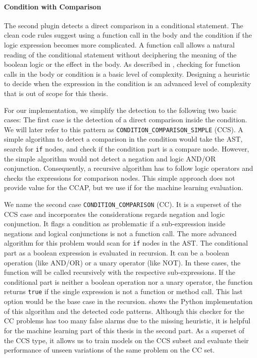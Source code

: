 \paragraph{Condition with Comparison}\label{sec:condition_comparison}
The second plugin detects a direct comparison in a conditional statement. 
The clean code rules suggest using a function call in the body and the condition if the logic expression becomes more complicated. A function call allows a natural reading of the conditional statement without deciphering the meaning of the boolean logic or the effect in the body. As described in , checking for function calls in the body or condition is a basic level of complexity. Designing a heuristic to decide when the expression in the condition is an advanced level of complexity that is out of scope for this thesis.

For our implementation, we simplify the detection to the following two basic cases: 
The first case is the detection of a direct comparison inside the condition. We will later refer to this pattern as \texttt{CONDITION\_COMPARISON\_SIMPLE} (CCS).
A simple algorithm to detect a comparison in the condition would take the AST, search for \texttt{if} nodes, and check if the condition part is a compare node.
However, the simple algorithm would not detect a negation and logic AND/OR conjunction. Consequently, a recursive algorithm has to follow logic operators and checks the expressions for comparison nodes. This simple approach does not provide value for the CCAP, but we use if for the machine learning evaluation. 

We name the second case \texttt{CONDITION\_COMPARISON} (CC). It is a superset of the CCS case and incorporates the considerations regards negation and logic conjunction. It flags a condition as problematic if a sub-expression inside negations and logical conjunctions is not a function call.
The more advanced algorithm for this problem would scan for \texttt{if} nodes in the AST. The conditional part as a boolean expression is evaluated in recursion. It can be a boolean operation (like AND/OR) or a unary operator (like NOT). In these cases, the function will be called recursively with the respective sub-expressions. If the conditional part is neither a boolean operation nor a unary operator, the function returns \texttt{true} if the single expression is not a function or method call. This last option would be the base case in the recursion.  shows the Python implementation of this algorithm and the detected code patterns. Although this checker for the CC problems has too many false alarms due to the missing heuristic, it is helpful for the machine learning part of this thesis in the second part. As a superset of the CCS type, it allows us to train models on the CCS subset and evaluate their performance of unseen variations of the same problem on the CC set.

